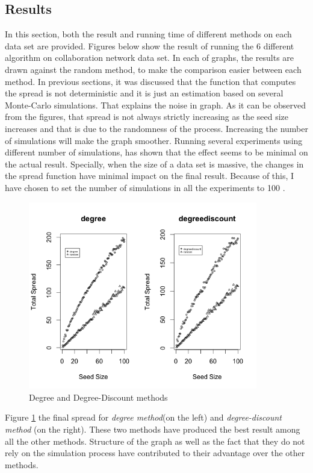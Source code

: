 \documentclass[english]{tktltiki}
\begin{document}
\subsection{Results}
In this section, both the result and running time of different methods on each data set are provided. Figures below show the result of running the 6 different algorithm on collaboration network data set. In each of graphs, the results are drawn against the random method, to make the comparison easier between each method. In previous sections, it was discussed that the function that computes the spread is not deterministic and it is just an estimation based on several Monte-Carlo simulations. That explains the noise in graph. As it can be observed from the figures, that spread is not always strictly increasing as the seed size increases and that is due to the randomness of the process. Increasing the number of simulations will make the graph smoother. Running several experiments using different number of simulations, has shown that the effect seems to be minimal on the actual result. Specially, when the size of a data set is massive, the changes in the spread function have minimal impact on the final result. Because of this, I have chosen to set the number of simulations in all the experiments to 100 .
\begin{figure}[ht!]

\centering
\includegraphics[width=100mm]{figures/hep/degree-degreediscount.png}
\caption{Degree and Degree-Discount methods}
\label{hep:degdiscount}
\end{figure}
Figure \ref{hep:degdiscount} the final spread for \textit{degree method}(on the left) and \textit{degree-discount method} (on the right). These two methods have produced the best result among all the other methods. Structure of the graph as well as the fact that they do not rely on the simulation process have contributed to their advantage over the other methods.
\end{document}
